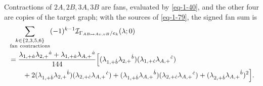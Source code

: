 \documentclass[11pt]{article}
\numberwithin{equation}{section}
\numberwithin{figure}{section}
\numberwithin{table}{section}
\begin{document}
Contractions of $2A,2B,3A,3B$ are fans, evaluated by \eqref{eq-1-40}, and the other four are copies of the target graph; with the sources of \eqref{eq-1-79}, the signed fan sum is
\begin{equation*}
\begin{aligned}
&\sum_{\substack{k\in\{2,3,5,6\}\\\mathrm{fan\ contractions}}}
(-1)^{k-1}\mathcal I_{\Gamma_{AB\mapsto Av,vB}/e_k}(\lambda;0)\\
&=\frac{\lambda_{1,+\dot a}\lambda_{2,+}{}^{\dot a}
+\lambda_{1,+\dot a}\lambda_{A,+}{}^{\dot a}}{144}
\Bigl[
(\lambda_{1,+\dot b}\lambda_{2,+}{}^{\dot b})(\lambda_{1,+\dot c}\lambda_{A,+}{}^{\dot c})\\
&\qquad+2(\lambda_{1,+\dot b}\lambda_{2,+}{}^{\dot b})(\lambda_{2,+\dot c}\lambda_{A,+}{}^{\dot c})
+(\lambda_{1,+\dot b}\lambda_{A,+}{}^{\dot b})(\lambda_{2,+\dot c}\lambda_{A,+}{}^{\dot c})
+(\lambda_{2,+\dot b}\lambda_{A,+}{}^{\dot b})^2\Bigr].
\end{aligned}
\end{equation*}
\end{document}
